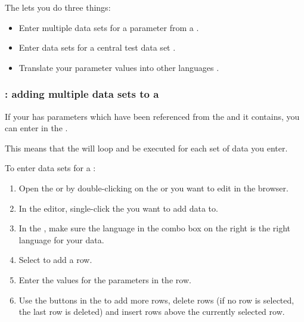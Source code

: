 
The \gddatasetsview{} lets you do three things:
\begin{itemize}
\item Enter multiple data sets for a parameter from a \gdcase{} .
\item Enter data sets for a central test data set .
\item Translate your parameter values into other languages . 
\end{itemize}


\subsubsection{\gddatasetsview{}: adding multiple data sets to a \gdcase{}}
\label{TasksDSVDataSets}
If your \gdcase{} has parameters which have been referenced from the \gdcases{} and \gdsteps{} it contains, you can enter  in the \gddatasetsview{}. 

This means that the \gdcase{} will loop and be executed for each set of data you enter. 

To enter data sets for a \gdcase{}:
\begin{enumerate}
\item Open the \gdtestcaseeditor{} or \gdtestsuiteeditor{} by double-clicking on the \gdcase{} or \gdsuite{} you want to edit in the browser. 
\item In the editor, single-click the \gdcase{} you want to add data to. 
\item In the \gddatasetsview{}, make sure the language in the combo box on the right is the right language for your data. 
\item Select  to add a row. 
\item Enter the values for the parameters in the row. 
\item Use the buttons in the \gddatasetsview{} to  add more rows, delete rows (if no row is selected, the last row is deleted) and insert rows above the currently selected row. 
\end{enumerate}


